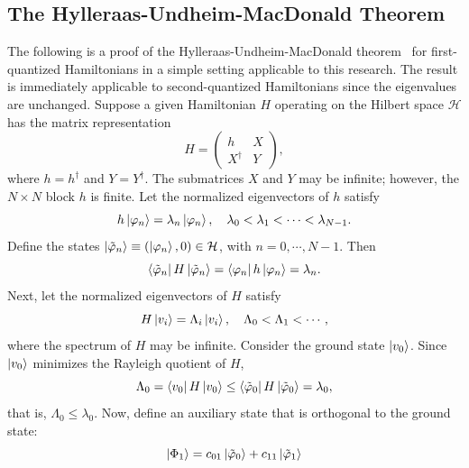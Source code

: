 \documentclass[aps,10pt,superscriptaddress,floatfix,nofootinbib,notitlepage]{revtex4-1}
\begin{document}
\subsection{The Hylleraas-Undheim-MacDonald Theorem}

 
The following is a proof of the Hylleraas-Undheim-MacDonald theorem~\cite{HU1930,PhysRev.43.830} for first-quantized Hamiltonians in a simple setting applicable to this research. The result is immediately applicable to second-quantized Hamiltonians since the eigenvalues are unchanged. Suppose a given Hamiltonian $H$ operating on the Hilbert space $\mathcal{H}$ has the matrix representation
\begin{equation}
    H
    =\begin{pmatrix}
        h & X \\
        X^\dag & Y
    \end{pmatrix},
\end{equation}
where $h=h^\dag$ and $Y=Y^\dag$. The submatrices $X$ and $Y$ may be infinite; however, the $N\times N$ block $h$ is finite. Let the normalized eigenvectors of $h$ satisfy
\begin{equation}
    h\ket{\varphi_n}
    =\lambda_n\ket{\varphi_n},
    \quad
    \lambda_0<\lambda_1<\cdots<\lambda_{N-1}.
\end{equation}
Define the states $\ket{\tilde{\varphi}_n}\equiv(\ket{\varphi_n},0)\in\mathcal{H}$, with $n=0,\cdots,N-1$. Then
\begin{equation}
    \bra{\tilde{\varphi}_n}H\ket{\tilde{\varphi}_n}
    =\bra{\varphi_n}h\ket{\varphi_n}
    =\lambda_n.
\end{equation}
Next, let the normalized eigenvectors of $H$ satisfy
\begin{equation}
    H\ket{v_i}
    =\Lambda_i\ket{v_i},
    \quad
    \Lambda_0<\Lambda_1<\cdots,
\end{equation}
where the spectrum of $H$ may be infinite. Consider the ground state $\ket{v_0}$. Since $\ket{v_0}$ minimizes the Rayleigh quotient of $H$,
\begin{equation}
    \Lambda_0
    =\bra{v_0}H\ket{v_0}
    \leq
    \bra{\tilde{\varphi}_0}H\ket{\tilde{\varphi}_0}
    =\lambda_0,
\end{equation}
that is, $\Lambda_0\leq\lambda_0$. Now, define an auxiliary  state that is orthogonal to the ground state: 
\begin{equation}
    \ket{\Phi_1}
    =c_{01}
    \ket{\tilde{\varphi}_0}
    +c_{11}
    \ket{\tilde{\varphi}_1}
\end{equation}
\end{document}
